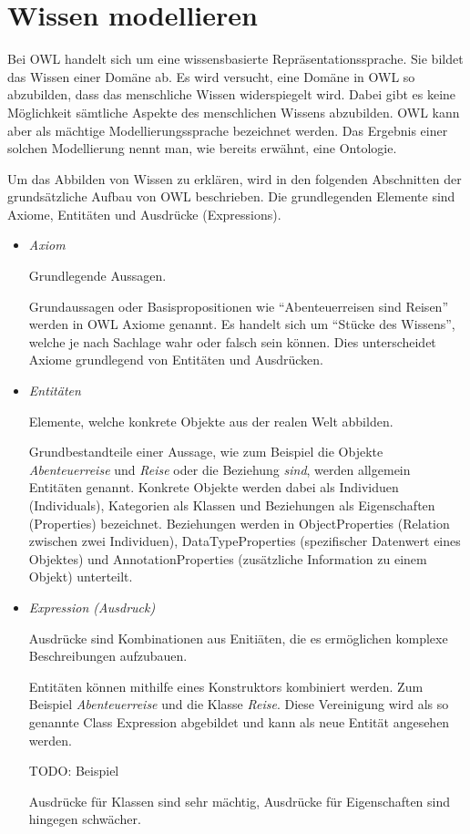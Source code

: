 \section{Wissen modellieren}
\label{sec:owl_owl_wissenModellieren}
Bei OWL handelt sich um eine wissensbasierte Repräsentationssprache. Sie bildet das Wissen einer Domäne ab. Es wird versucht, eine Domäne in OWL so abzubilden, dass das menschliche Wissen widerspiegelt wird. Dabei gibt es keine Möglichkeit sämtliche Aspekte des menschlichen Wissens abzubilden. OWL kann aber als mächtige Modellierungssprache bezeichnet werden. Das Ergebnis einer solchen Modellierung nennt man, wie bereits erwähnt, eine Ontologie.

Um das Abbilden von Wissen zu erklären, wird in den folgenden Abschnitten der grundsätzliche Aufbau von OWL beschrieben. Die grundlegenden Elemente sind Axiome, Entitäten und Ausdrücke (Expressions).

\begin{itemize}
	\item \textit{Axiom}

        Grundlegende Aussagen.

        Grundaussagen  oder Basispropositionen wie ``Abenteuerreisen sind Reisen'' werden in OWL Axiome genannt. Es handelt sich  um ``Stücke des Wissens'', welche je nach Sachlage wahr oder falsch sein können. Dies unterscheidet Axiome grundlegend von Entitäten und Ausdrücken.

    \item \textit{Entitäten}

        Elemente, welche konkrete Objekte aus der realen Welt abbilden.

        Grundbestandteile einer Aussage, wie zum Beispiel die Objekte \textit{Abenteuerreise} und \textit{Reise} oder die Beziehung \textit{sind}, werden allgemein Entitäten genannt. Konkrete Objekte werden dabei als Individuen (Individuals), Kategorien als Klassen und Beziehungen als Eigenschaften (Properties) bezeichnet. Beziehungen werden in ObjectProperties (Relation zwischen zwei Individuen), DataTypeProperties (spezifischer Datenwert eines Objektes) und AnnotationProperties (zusätzliche Information zu einem Objekt) unterteilt.

	\item \textit{Expression (Ausdruck)}

        Ausdrücke sind Kombinationen aus Enitiäten, die es ermöglichen komplexe Beschreibungen aufzubauen.

        Entitäten können mithilfe eines Konstruktors kombiniert werden. Zum Beispiel \textit{Abenteuerreise} und die Klasse \textit{Reise}. Diese Vereinigung wird als so genannte Class Expression abgebildet und kann als neue Entität angesehen werden.

        TODO: Beispiel

        Ausdrücke für Klassen sind sehr mächtig, Ausdrücke für Eigenschaften sind hingegen schwächer.
\end{itemize}

